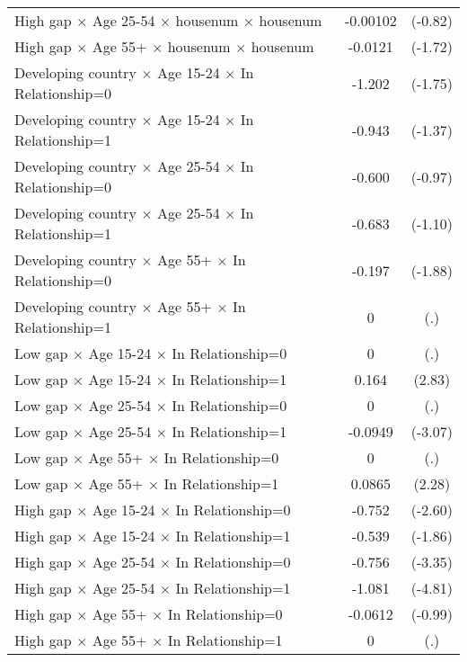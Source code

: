 {\begin{longtable}{l*{1}{cc}}
High gap $\times$ Age 25-54 $\times$ housenum $\times$ housenum&    -0.00102         &     (-0.82)\\
High gap $\times$ Age 55+ $\times$ housenum $\times$ housenum&     -0.0121         &     (-1.72)\\
Developing country $\times$ Age 15-24 $\times$ In Relationship=0&      -1.202         &     (-1.75)\\
Developing country $\times$ Age 15-24 $\times$ In Relationship=1&      -0.943         &     (-1.37)\\
Developing country $\times$ Age 25-54 $\times$ In Relationship=0&      -0.600         &     (-0.97)\\
Developing country $\times$ Age 25-54 $\times$ In Relationship=1&      -0.683         &     (-1.10)\\
Developing country $\times$ Age 55+ $\times$ In Relationship=0&      -0.197         &     (-1.88)\\
Developing country $\times$ Age 55+ $\times$ In Relationship=1&           0         &         (.)\\
Low gap $\times$ Age 15-24 $\times$ In Relationship=0&           0         &         (.)\\
Low gap $\times$ Age 15-24 $\times$ In Relationship=1&       0.164\sym{**} &      (2.83)\\
Low gap $\times$ Age 25-54 $\times$ In Relationship=0&           0         &         (.)\\
Low gap $\times$ Age 25-54 $\times$ In Relationship=1&     -0.0949\sym{**} &     (-3.07)\\
Low gap $\times$ Age 55+ $\times$ In Relationship=0&           0         &         (.)\\
Low gap $\times$ Age 55+ $\times$ In Relationship=1&      0.0865\sym{*}  &      (2.28)\\
High gap $\times$ Age 15-24 $\times$ In Relationship=0&      -0.752\sym{**} &     (-2.60)\\
High gap $\times$ Age 15-24 $\times$ In Relationship=1&      -0.539         &     (-1.86)\\
High gap $\times$ Age 25-54 $\times$ In Relationship=0&      -0.756\sym{***}&     (-3.35)\\
High gap $\times$ Age 25-54 $\times$ In Relationship=1&      -1.081\sym{***}&     (-4.81)\\
High gap $\times$ Age 55+ $\times$ In Relationship=0&     -0.0612         &     (-0.99)\\
High gap $\times$ Age 55+ $\times$ In Relationship=1&           0         &         (.)\\

\end{longtable}}
